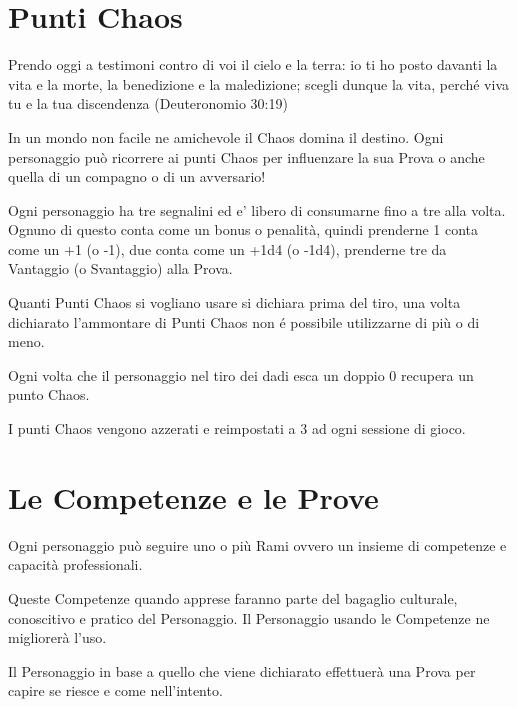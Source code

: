 \documentclass[12pt,a4paper,twoside,openany]{book}
\begin{document}
\section{Punti Chaos}

\begin{multicols}{2}
	

\begin{changemargin}{0.3cm}{0.3cm}\begin{enfasi}{
Prendo oggi a testimoni contro di voi il cielo e la terra: io ti ho posto davanti la vita e la morte, la benedizione e la maledizione; scegli dunque la vita, perché viva tu e la tua discendenza (Deuteronomio 30:19)
}\end{enfasi}\end{changemargin}

In un mondo non facile ne amichevole il Chaos domina il destino. Ogni personaggio può ricorrere ai punti Chaos per influenzare la sua Prova o anche quella di un compagno o di un avversario!

Ogni personaggio ha tre segnalini ed e' libero di consumarne fino a tre alla volta. Ognuno di questo conta come un bonus o penalità, quindi prenderne 1 conta come un +1 (o -1), due conta come un +1d4 (o -1d4), prenderne tre da Vantaggio (o Svantaggio) alla Prova. 

Quanti Punti Chaos si vogliano usare si dichiara prima del tiro, una volta dichiarato l'ammontare di Punti Chaos non é possibile utilizzarne di più o di meno.

Ogni volta che il personaggio nel tiro dei dadi esca un doppio 0 recupera un punto Chaos.

I punti Chaos vengono azzerati e reimpostati a 3 ad ogni sessione di gioco.

\end{multicols}

\pagebreak

\section{Le Competenze e le Prove}

\begin{multicols}{2}

Ogni personaggio può seguire uno o più Rami ovvero un insieme di competenze e capacità professionali.

Queste Competenze quando apprese faranno parte del bagaglio culturale, conoscitivo e pratico del Personaggio. Il Personaggio usando le Competenze ne migliorerà l'uso.

Il Personaggio in base a quello che viene dichiarato effettuerà una Prova per capire se riesce e come nell'intento. 

\end{multicols}
\end{document}
